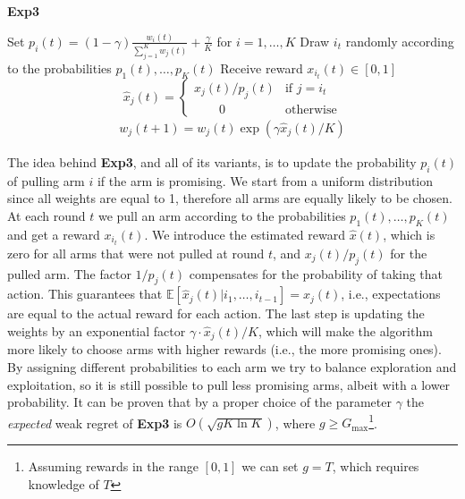 \documentclass[12pt,a4paper]{article}
\begin{document}
\begin{algorithm}
	\caption{\textbf{Exp3}}\label{alg:Exp3}
	\begin{algorithmic}[1]         
		\Require{ Real $\gamma$ $\in$ (0,1] }
		\State Set $p_i(t) = (1-\gamma)\frac{w_i(t)}{\sum_{j=1}^{K}w_j(t)}+\frac{\gamma}{K}$ for $i = 1,\dots, K$
		\State Draw $i_t$ randomly according to the probabilities $p_1(t), \dots, p_K(t)$
		\State Receive reward $x_{i_t}(t) \in [0, 1]$
		\[ \hat{x}_j(t) =\begin{cases} 
			x_j(t)/p_j(t) & \text{if} \,\, j = i_t \\
			\,\,\,\,\,\,\,\,\,\,\,\,0 & \text{otherwise} 
		\end{cases}
		\]
		\begin{align*}
			w_j(t + 1) = w_j(t)\exp(\gamma\hat{x}_j(t)/K)
		\end{align*}
		\EndFor
	\end{algorithmic}
\end{algorithm}
The idea behind \textbf{Exp3}, and all of its variants, is to update the probability $p_i(t)$ of pulling arm $i$ if the arm is promising. We start from a uniform distribution since all weights are equal to 1, therefore all arms are equally likely to be chosen. At each round $t$ we pull an arm according to the probabilities $p_1(t),\dots, p_K(t)$ and get a reward $x_{i_t}(t)$. We introduce the estimated reward $\hat{x}(t)$, which is  zero for all arms that were not pulled at round $t$, and $x_j(t)/p_j(t)$ for the pulled arm. The factor $1/p_j(t)$ compensates for the probability of taking that action. This guarantees that $\mathbb{E}[\hat{x}_j(t)|i_1,\dots, i_{t-1}] = x_j(t)$, i.e., expectations are equal to the actual reward for each action. The last step is updating the weights by an exponential factor $\gamma\cdot \hat{x}_j(t)/K$, which will make the algorithm more likely to choose arms with higher rewards (i.e., the more promising ones). By assigning different probabilities to each arm we try to balance exploration and exploitation, so it is still possible to pull less promising arms, albeit with a lower probability.
It can be proven that by a proper choice of the parameter $\gamma$ the \textit{expected} weak regret of \textbf{Exp3} is ${O}(\sqrt{gK\ln K})$, where $g \geq G_{\max}$\footnote{Assuming rewards in the range $[0,1]$ we can set $g = T$, which requires knowledge of $T$}. 
\end{document}
